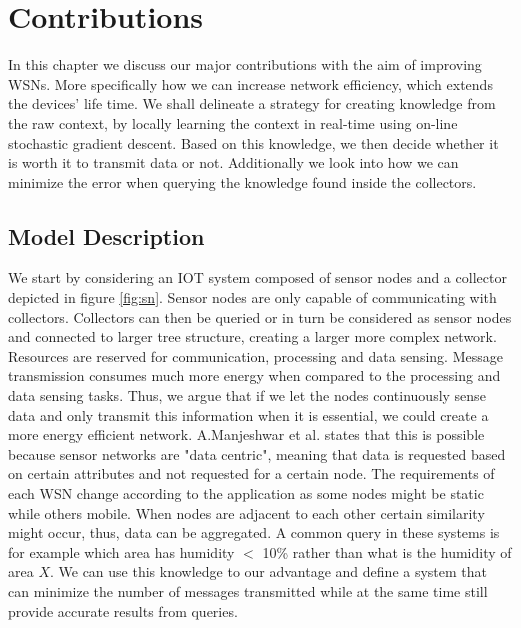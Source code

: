 \documentclass{mproj}
\begin{document}

\chapter{Contributions}
In this chapter we discuss our major contributions with the aim of improving WSNs. More specifically how we can increase network efficiency, which extends the devices' life time. We shall delineate a strategy for creating knowledge from the raw context, by locally learning the context in real-time using on-line stochastic gradient descent. Based on this knowledge, we then decide whether it is worth it to transmit data or not.
Additionally we look into how we can minimize the error when querying the knowledge found inside the collectors.

\section{Model Description}
We start by considering an IOT system composed of sensor nodes and a collector depicted in figure \ref{fig:sn}. Sensor nodes are only capable of communicating with collectors. Collectors can then be queried or in turn be considered as sensor nodes and connected to larger tree structure, creating a larger more complex network. Resources are reserved for communication, processing and data sensing. Message transmission consumes much more energy when compared to the processing and data sensing tasks. \cite{teen} Thus, we argue that if we let the nodes continuously sense data and only transmit this information when it is essential, we could create a more energy efficient network. A.Manjeshwar et al. \cite{teen} states that this is possible because sensor networks are "data centric", meaning that data is requested based on certain attributes and not requested for a certain node. The requirements of each WSN change according to the application as some nodes might be static while others mobile. When nodes are adjacent to each other certain similarity might occur, thus, data can be aggregated. A common query in these systems is for example which area has humidity $<$ 10\% rather than what is the humidity of area $X$. We can use this knowledge to our advantage and define a system that can minimize the number of messages transmitted while at the same time still provide accurate results from queries.
\end{document}
